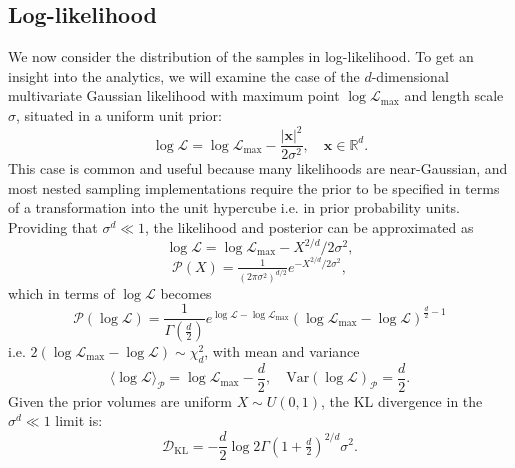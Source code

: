 \documentclass[usenatbib]{mnras}
\newcommand{\Like}{\mathcal{L}}
\newcommand{\logLmax}{\log \Like_\mathrm{max}}
\begin{document}
\subsection{Log-likelihood}\label{sec:logL}
We now consider the distribution of the samples in log-likelihood. To get an insight into the analytics, we will examine the case of the $d$-dimensional multivariate Gaussian likelihood with maximum point $\logLmax$ and length scale $\sigma$, situated in a uniform unit prior:
\begin{equation}\label{eq:logL_x}
    \log\Like = \logLmax - \frac{|\bm{x}|^{2}}{2\sigma^{2}}, \quad \bm{x} \in \mathbb{R}^{d}.
\end{equation}
This case is common and useful because many likelihoods are near-Gaussian, and most nested sampling implementations require the prior to be specified in terms of a transformation into the unit hypercube i.e. in prior probability units. Providing that $\sigma^d \ll 1$, the likelihood and posterior can be approximated as
\begin{equation}\label{eq:gaussian_logL}
    \log \Like = \logLmax - X^{2/d}/2\sigma^2,
\end{equation}
\begin{equation}
    \mathcal{P}(X) = \tfrac{1}{(2\pi\sigma^2)^{d/2}} e^{-X^{2/d}/2\sigma^2}, 
    \label{eqn:PX}
\end{equation}
which in terms of $\log\mathcal{L}$ becomes
\begin{equation}
    \mathcal{P}(\log\mathcal{L}) = \frac{1}{\Gamma\left(\frac{d}{2}\right)}e^{\log\mathcal{L}-\log\mathcal{L}_\mathrm{max}} (\log\mathcal{L}_\mathrm{max}-\log\mathcal{L})^{\frac{d}{2}-1}
\end{equation}
i.e. $2(\log\mathcal{L}_\mathrm{max}-\log\mathcal{L}) \sim \chi^2_{d}$, with mean and variance
\begin{equation}
    \langle\log\mathcal{L}\rangle_\mathcal{P} = \log\mathcal{L}_\mathrm{max} - \frac{d}{2},  \quad \mathrm{Var}(\log\mathcal{L})_\mathcal{P} = \frac{d}{2}.
\end{equation}
Given the prior volumes are uniform $X\sim U(0,1)$, the KL divergence in the $\sigma^d \ll 1$ limit is:
\begin{equation}
\mathcal{D}_\mathrm{KL} = -\frac{d}{2}\log 2 \Gamma(1+\tfrac{d}{2})^{2/d} \sigma^2.
\end{equation}
\end{document}
